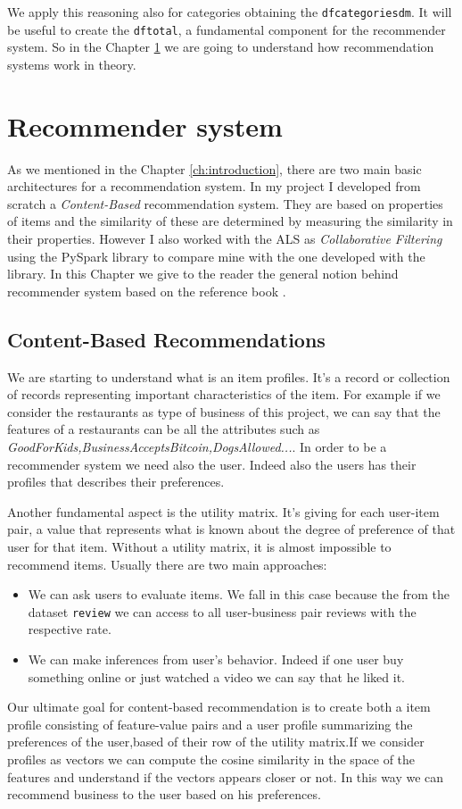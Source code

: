 \documentclass[12pt,english]{report}
\begin{document}
We apply this reasoning also for categories obtaining the \texttt{df\textunderscore categories\textunderscore dm}. It will be useful to create the \texttt{df\textunderscore total}, a fundamental component for the recommender system. So in the Chapter \ref{ch:recsys} we are going to understand how recommendation systems work in theory.
\chapter{Recommender system}\label{ch:recsys}
As we mentioned in the Chapter \ref{ch:introduction}, there are two main basic architectures for a recommendation system. In my project I developed from scratch a \textit{Content-Based} recommendation system. They are based on properties of items and the similarity of these are determined by measuring the similarity in their properties.
However I also worked with the ALS as \textit{Collaborative Filtering} using the PySpark library to compare mine with the one developed with the library. In this Chapter we give to the reader the general notion behind recommender system based on the reference book \cite{rajaraman2014mining}.
\section{Content-Based Recommendations}
We are starting to understand what is an item profiles. It's a record or collection of records representing important characteristics of the item. For example if we consider the restaurants as type of business of this project, we can say that the features of a restaurants can be all the attributes such as \textit{GoodForKids,BusinessAcceptsBitcoin,DogsAllowed...}.
In order to be a recommender system we need also the user. Indeed also the users has their profiles that describes their preferences. \par
Another fundamental aspect is the utility matrix. It's giving for each user-item pair, a value that represents what is known about the degree of preference of that user for that item. Without a utility matrix, it is almost impossible to recommend items. Usually there are two main approaches: 
\begin{itemize}
 \item We can ask users to evaluate items. We fall in this case because the from the dataset \texttt{review} we can access to all user-business pair reviews with the respective rate.
 \item We can make inferences from user's behavior. Indeed if one user buy something online or just watched a video we can say that he liked it.
 \end{itemize} 
Our ultimate goal for content-based recommendation is to create both a item profile consisting of feature-value pairs and a user profile summarizing the preferences of the user,based of their row of the utility matrix.If we consider profiles as vectors we can compute the cosine similarity in the space of the features and understand if the vectors appears closer or not. In this way we can recommend business to the user based on his preferences.
\end{document}
